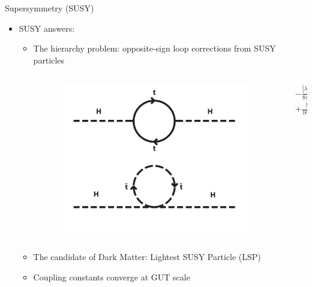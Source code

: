 \documentclass[10pt]{beamer}
\begin{document}
{\begin{frame}{Supersymmetry (SUSY)}
    \begin{itemize}
        \item SUSY answers:
        \begin{itemize}
            \item The hierarchy problem: opposite-sign loop corrections from SUSY particles\\
            \begin{columns}
                \begin{column}{0.2\textwidth}
                    \begin{figure}
                        \includegraphics[scale=0.09]{figures/one-loop-correction.png}
                    \end{figure}
                \end{column}
                \begin{column}{0.2\textwidth}
                    \begin{align*}
                        & - \frac{|\lambda_{f}^{2}|}{8\pi^{2}} \Lambda_{UV}^{2}\\
                        & +\frac{\lambda_{S}}{16\pi^{2}} \Lambda_{UV}^{2} \times 2
                    \end{align*}
                \end{column}
            \end{columns}
            \item The candidate of Dark Matter: Lightest SUSY Particle (LSP)
            \item Coupling constants converge at GUT scale

\end{itemize}
\end{itemize}
\end{frame}}
\end{document}
